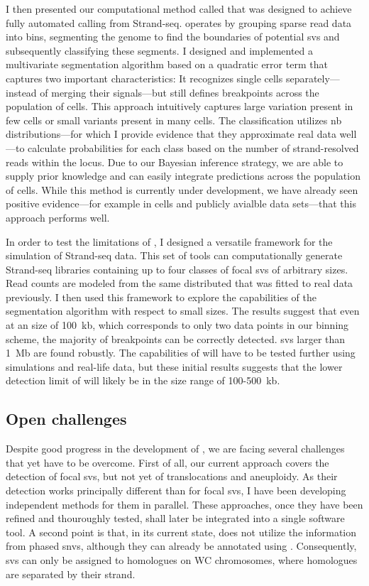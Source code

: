 I then presented our computational method called \mc that was designed to achieve
fully automated \sv calling from Strand-seq. \mc operates by grouping sparse
read data into bins, segmenting the genome to find the boundaries of potential
\acp{sv} and subsequently classifying these segments. I designed and implemented
a multivariate segmentation algorithm based on a quadratic error term that
captures two important characteristics: It recognizes single cells
separately---instead of merging their signals---but still defines breakpoints
across the population of cells. This approach intuitively captures large
variation present in few cells or small variants present in many cells. The \sv
classification utilizes \acl{nb} distributions---for which I provide evidence
that they approximate real data well---to calculate probabilities for each \sv
class based on the number of strand-resolved reads within the locus.
Due to our Bayesian inference strategy, we are able to supply prior knowledge
and can easily integrate \sv predictions across the population of cells. While
this method is currently under development, we have already seen positive
evidence---for example in \rpe cells and publicly avialble data sets---that this
approach performs well.

In order to test the limitations of \mc, I designed a versatile framework for
the simulation of Strand-seq data. This set of tools can computationally generate
Strand-seq libraries containing up to four classes of focal \acp{sv} of arbitrary
sizes. Read counts are modeled from the same \nb distributed that was fitted to
real data previously. I then used this framework to explore the capabilities of
the segmentation algorithm with respect to small \sv sizes. The results suggest that
even at an \sv size of 100~kb, which corresponds to only two data points in our
binning scheme, the majority of breakpoints can be correctly detected.
\Acp{sv} larger than 1~Mb are found robustly. The capabilities of \mc will have
to be tested further using simulations and real-life data, but these initial
results suggests that the lower detection limit of \mc will likely be in the
size range of 100-500~kb.




\subsection{Open challenges}
\label{sec:mosaic_challenges}

Despite good progress in the development of \mc, we are facing several
challenges that yet have to be overcome. First of all, our current approach
covers the detection of focal \acp{sv}, but not yet of translocations and
aneuploidy. As their detection works principally different than for focal \acp{sv},
I have been developing independent methods for them in parallel. These approaches,
once they have been refined and thouroughly tested, shall later be integrated into a
single software tool. A second point is that, in its current state, \mc does not
utilize the information from phased \acp{snv}, although they can already be
annotated using \strandphaser. Consequently, \acp{sv} can only be assigned
to homologues on WC chromosomes, where homologues are separated by their strand.


